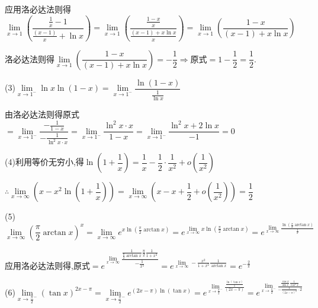 应用洛必达法则得$\lim\limits_{x \to 1}  \left( {\dfrac{{\frac{1}{x} - 1}}{{\frac{{\left( {x - 1} \right)}}{x} + \ln x}}} \right) = \lim\limits_{x \to 1}  \left( {\dfrac{{\frac{{1 - x}}{x}}}{{\frac{{\left( {x - 1} \right) + x\ln x}}{x}}}} \right) = \lim\limits_{x \to 1}  \left( {\dfrac{{1 - x}}{{\left( {x - 1} \right) + x\ln x}}} \right)$

洛必达法则得$\lim\limits_{x \to 1}  \left( {\dfrac{{1 - x}}{{\left( {x - 1} \right) + x\ln x}}} \right) =  - \dfrac{1}{2} \Rightarrow  $原式$= 1 - \dfrac{1}{2} = \dfrac{1}{2}$.

(3)$\mathop {\lim }\limits_{x \to {1^ - }} \ln x\ln (1 - x) = \mathop {\lim }\limits_{x \to {1^ - }} \dfrac{{\ln (1 - x)}}{{\frac{1}{{\ln x}}}}$

由洛必达法则得原式$ = \mathop {\lim }\limits_{x \to {1^ - }} \dfrac{{ - \frac{1}{{1 - x}}}}{{ - \frac{1}{{{{\ln }^2}x \cdot x}}}} = \mathop {\lim }\limits_{x \to {1^ - }} \dfrac{{{{\ln }^2}x\cdot x}}{{1 - x}} = \mathop {\lim }\limits_{x \to {1^ - }} \dfrac{{{{\ln }^2}x + 2\ln x}}{{ - 1}} = 0$

(4)利用等价无穷小,得$\ln (1 + \dfrac{1}{x}) = \dfrac{1}{x} - \dfrac{1}{2} \cdot \dfrac{1}{{{x^2}}} + o(\dfrac{1}{{{x^2}}})$

$\therefore \mathop {\lim }\limits_{x \to \infty } \left( {x - {x^2}\ln (1 + \dfrac{1}{x})} \right) = \mathop {\lim }\limits_{x \to \infty } \left( {x - x + \dfrac{1}{2} + o(\dfrac{1}{{{x^2}}})} \right) = \dfrac{1}{2}$

(5)$\mathop {\lim }\limits_{x \to \infty } {(\dfrac{\pi }{2}\arctan x)^x} = \mathop {\lim }\limits_{x \to \infty } {e^{x\ln (\frac{\pi }{2}\arctan x)}} = {e^{\mathop {\lim }\limits_{x \to \infty } x\ln (\frac{\pi }{2}\arctan x)}} = {e^{\mathop {\lim }\limits_{x \to \infty } \frac{{\ln (\frac{\pi }{2}\arctan x)}}{{\frac{1}{x}}}}}$

应用洛必达法则得,原式$ = {e^{\mathop {\lim }\limits_{x \to \infty } \dfrac{{\frac{1}{{\frac{\pi }{2}\arctan x}}\frac{\pi }{2}\frac{1}{{1 + {x^2}}}}}{{ - \frac{1}{{{x^2}}}}}}} = {e^{\mathop {\lim }\limits_{x \to \infty }  - \frac{{{x^2}}}{{1 + {x^2}}}\frac{1}{{\arctan x}}}} = {e^{ - \frac{2}{\pi }}}$

(6)$\mathop {\lim }\limits_{x \to {{\frac{\pi }{2}}^ - }} {(\tan x)^{2x - \pi }} = \mathop {\lim }\limits_{x \to {{\frac{\pi }{2}}^ - }} {e^{(2x - \pi )\ln (\tan x)}} = {e^{\mathop {\lim }\limits_{x \to {{\frac{\pi }{2}}^ - }} \frac{{\frac{{\ln (\tan x)}}{1}}}{{(2x - \pi )}}}} = {e^{\mathop {\lim }\limits_{x \to {{\frac{\pi }{2}}^ - }} \frac{{\frac{{\cos x}}{{\sin x}}\frac{1}{{{{\cos }^2}x}}}}{{ - \frac{1}{{{{(2x - \pi )}^2}}}\cdot 2}}}}$

